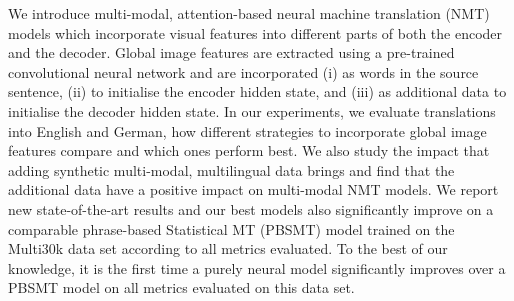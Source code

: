 We introduce multi-modal, attention-based neural machine translation (NMT) models which incorporate visual features into different parts of both the encoder and the decoder. Global image features are extracted using a pre-trained convolutional neural network and are incorporated (i) as words in the source sentence, (ii) to initialise the encoder hidden state, and (iii) as additional data to initialise the decoder hidden state. In our experiments, we evaluate translations into English and German, how different strategies to incorporate global image features compare and which ones perform best. We also study the impact that adding synthetic multi-modal, multilingual data brings and find that the additional data have a positive impact on multi-modal NMT models. We report new state-of-the-art results and our best models also significantly improve on a comparable phrase-based Statistical MT (PBSMT) model trained on the Multi30k data set according to all metrics evaluated. To the best of our knowledge, it is the first time a purely neural model significantly improves over a PBSMT model on all metrics evaluated on this data set.
